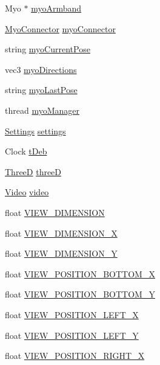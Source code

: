 \begin{DoxyCompactItemize}
Myo $\ast$ \hyperlink{classManager_a3764298317afa9f0e59e4366c1aac0a6}{myo\+Armband}
\item 
\hyperlink{classMyoConnector}{Myo\+Connector} \hyperlink{classManager_a8117b9ff0ea4c66e1379e088a6d28c5e}{myo\+Connector}
\item 
string \hyperlink{classManager_a86e49f5468df074459dfb578d1c24cfa}{myo\+Current\+Pose}
\item 
vec3 \hyperlink{classManager_a335d41f08d1075e7622a1caa64df2bdc}{myo\+Directions}
\item 
string \hyperlink{classManager_ac3e8cf065d787b8a79bd631dd54cfbc6}{myo\+Last\+Pose}
\item 
thread \hyperlink{classManager_a2b4f07b099ad6839729bd03bbeea52ad}{myo\+Manager}
\item 
\hyperlink{classSettings}{Settings} \hyperlink{classManager_a1799e8219d94565f72625e6821eda993}{settings}
\item 
Clock \hyperlink{classManager_a99819b2b5c34b66e76762ae20e6c6f55}{t\+Deb}
\item 
\hyperlink{classThreeD}{ThreeD} \hyperlink{classManager_aec79717dcdb413187e068925497eda32}{threeD}
\item 
\hyperlink{classVideo}{Video} \hyperlink{classManager_ab8b44618fbef7c927598d8154a5415de}{video}
\item 
float \hyperlink{classManager_a23e4b935abf9df5d71e5bf9dc89a9062}{V\+I\+E\+W\+\_\+\+D\+I\+M\+E\+N\+S\+I\+ON}
\item 
float \hyperlink{classManager_a835d170601628a807609db4f797c2382}{V\+I\+E\+W\+\_\+\+D\+I\+M\+E\+N\+S\+I\+O\+N\+\_\+X}
\item 
float \hyperlink{classManager_a2d875780ce3f0925ccd4165312600c06}{V\+I\+E\+W\+\_\+\+D\+I\+M\+E\+N\+S\+I\+O\+N\+\_\+Y}
\item 
float \hyperlink{classManager_aa1a80343a56401148926e13111041089}{V\+I\+E\+W\+\_\+\+P\+O\+S\+I\+T\+I\+O\+N\+\_\+\+B\+O\+T\+T\+O\+M\+\_\+X}
\item 
float \hyperlink{classManager_acccc2f78c0d94ca985fc83691daec707}{V\+I\+E\+W\+\_\+\+P\+O\+S\+I\+T\+I\+O\+N\+\_\+\+B\+O\+T\+T\+O\+M\+\_\+Y}
\item 
float \hyperlink{classManager_a48a66a40d7d6f25ca5373c104046e716}{V\+I\+E\+W\+\_\+\+P\+O\+S\+I\+T\+I\+O\+N\+\_\+\+L\+E\+F\+T\+\_\+X}
\item 
float \hyperlink{classManager_a30a44561824762281c6386bc8c395be1}{V\+I\+E\+W\+\_\+\+P\+O\+S\+I\+T\+I\+O\+N\+\_\+\+L\+E\+F\+T\+\_\+Y}
\item 
float \hyperlink{classManager_a186c67951bc370d8abcb7e4015dd8ff0}{V\+I\+E\+W\+\_\+\+P\+O\+S\+I\+T\+I\+O\+N\+\_\+\+R\+I\+G\+H\+T\+\_\+X}

\end{DoxyCompactItemize}
